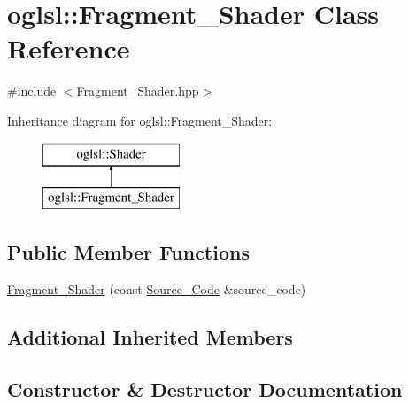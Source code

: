 \hypertarget{classoglsl_1_1_fragment___shader}{}\section{oglsl\+:\+:Fragment\+\_\+\+Shader Class Reference}
\label{classoglsl_1_1_fragment___shader}


{\ttfamily \#include $<$Fragment\+\_\+\+Shader.\+hpp$>$}

Inheritance diagram for oglsl\+:\+:Fragment\+\_\+\+Shader\+:\begin{figure}[H]
\begin{center}
\leavevmode
\includegraphics[height=2.000000cm]{classoglsl_1_1_fragment___shader}
\end{center}
\end{figure}
\subsection*{Public Member Functions}
\begin{DoxyCompactItemize}
\item 
\mbox{\hyperlink{classoglsl_1_1_fragment___shader_a69700cf85e0a653b0de60f3694886f4f}{Fragment\+\_\+\+Shader}} (const \mbox{\hyperlink{classoglsl_1_1_shader_1_1_source___code}{Source\+\_\+\+Code}} \&source\+\_\+code)
\end{DoxyCompactItemize}
\subsection*{Additional Inherited Members}


\subsection{Constructor \& Destructor Documentation}
\mbox{\label{classoglsl_1_1_fragment___shader_a69700cf85e0a653b0de60f3694886f4f}} 
